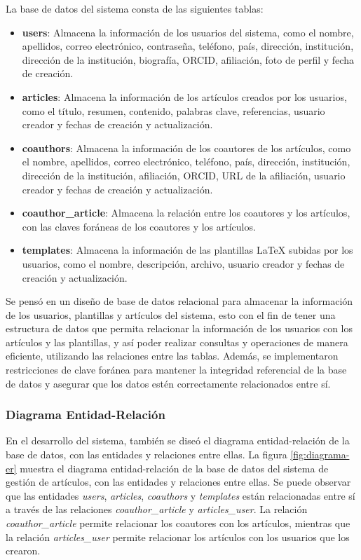 La base de datos del sistema consta de las siguientes tablas:

\begin{itemize}
    \item \textbf{users}: Almacena la información de los usuarios del sistema, como el nombre, apellidos, correo electrónico, contraseña, teléfono, país, dirección, institución, dirección de la institución, biografía, ORCID, afiliación, foto de perfil y fecha de creación.
    \item \textbf{articles}: Almacena la información de los artículos creados por los usuarios, como el título, resumen, contenido, palabras clave, referencias, usuario creador y fechas de creación y actualización.
    \item \textbf{coauthors}: Almacena la información de los coautores de los artículos, como el nombre, apellidos, correo electrónico, teléfono, país, dirección, institución, dirección de la institución, afiliación, ORCID, URL de la afiliación, usuario creador y fechas de creación y actualización.
    \item \textbf{coauthor\_article}: Almacena la relación entre los coautores y los artículos, con las claves foráneas de los coautores y los artículos.
    \item \textbf{templates}: Almacena la información de las plantillas LaTeX subidas por los usuarios, como el nombre, descripción, archivo, usuario creador y fechas de creación y actualización.
\end{itemize}

Se pensó en un diseño de base de datos relacional para almacenar la información de los usuarios, plantillas y artículos del sistema, esto con el fin de tener una estructura de datos que permita relacionar la información de los usuarios con los artículos y las plantillas, y así poder realizar consultas y operaciones de manera eficiente, utilizando las relaciones entre las tablas. Además, se implementaron restricciones de clave foránea para mantener la integridad referencial de la base de datos y asegurar que los datos estén correctamente relacionados entre sí.

\subsubsection{Diagrama Entidad-Relación}
En el desarrollo del sistema, también se diseó el diagrama entidad-relación de la base de datos, con las entidades y relaciones entre ellas. La figura \ref{fig:diagrama-er} muestra el diagrama entidad-relación de la base de datos del sistema de gestión de artículos, con las entidades y relaciones entre ellas. Se puede observar que las entidades \textit{users}, \textit{articles}, \textit{coauthors} y \textit{templates} están relacionadas entre sí a través de las relaciones \textit{coauthor\_article} y \textit{articles\_user}. La relación \textit{coauthor\_article} permite relacionar los coautores con los artículos, mientras que la relación \textit{articles\_user} permite relacionar los artículos con los usuarios que los crearon.

